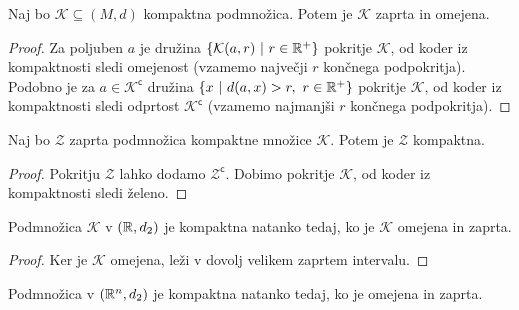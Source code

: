 \documentclass[12pt, a4paper]{article}
\begin{document}
\begin{trditev}
Naj bo $\mathcal{K}\subseteq(M,d)$ kompaktna podmnožica. Potem je $\mathcal{K}$ zaprta in omejena.
\end{trditev}

\begin{proof}
Za poljuben $a$ je družina $\left\{\mathcal{K}(a,r)~\middle\vert~r\in\mathbb{R}^+\right\}$ pokritje $\mathcal{K}$, od koder iz kompaktnosti sledi omejenost (vzamemo največji $r$ končnega podpokritja). Podobno je za $a\in\mathcal{K}^\mathsf{c}$ družina $\left\{x~\middle\vert~d(a,x)>r,~r\in\mathbb{R}^+\right\}$ pokritje $\mathcal{K}$, od koder iz kompaktnosti sledi odprtost $\mathcal{K}^\mathsf{c}$ (vzamemo najmanjši $r$ končnega podpokritja).
\end{proof}

\begin{trditev}
Naj bo $\mathcal{Z}$ zaprta podmnožica kompaktne množice $\mathcal{K}$. Potem je $\mathcal{Z}$ kompaktna.
\end{trditev}

\begin{proof}
Pokritju $\mathcal{Z}$ lahko dodamo $\mathcal{Z}^\mathsf{c}$. Dobimo pokritje $\mathcal{K}$, od koder iz kompaktnosti sledi želeno.
\end{proof}

\begin{posledica}
Podmnožica $\mathcal{K}$ v $(\mathbb{R},d_2)$ je kompaktna natanko tedaj, ko je $\mathcal{K}$ omejena in zaprta.
\end{posledica}

\begin{proof}
Ker je $\mathcal{K}$ omejena, leži v dovolj velikem zaprtem intervalu.
\end{proof}

\begin{izrek}
Podmnožica v $(\mathbb{R}^n,d_2)$ je kompaktna natanko tedaj, ko je omejena in zaprta.
\end{izrek}


\newpage
\printindex
\end{document}
